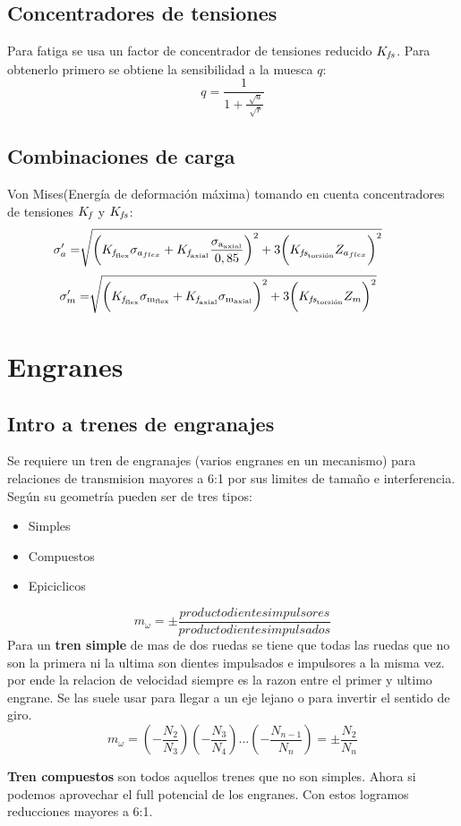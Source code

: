 \documentclass[twocolumn,10pt]{article}
\newcommand{\ansp}{\!\!\!\!\!\!\!}%
\newcommand{\bigpar}[1]{\bigg(
#1 \bigg) }
\newcommand{\Kf}[1]{ K_{\textit{\textrm{f}}_{\textrm{#1}}} }
\newcommand{\Kfs}[1]{ K_{\textit{\textrm{fs}}_{\textrm{#1}}} }
\newcommand{\siga}[1]{ \sigma_{{\textrm{a}}_{\textrm{#1}}} }
\newcommand{\sigm}[1]{ \sigma_{{\textrm{m}}_{\textrm{#1}}} }
\begin{document}
\subsection{Concentradores de tensiones}
Para fatiga se usa un factor de concentrador de tensiones reducido $\Kfs{}$. Para obtenerlo primero se obtiene la sensibilidad a la muesca $q$:
$$q=\frac{1}{1+\frac{\sqrt[]{a}}{\sqrt[]{r}}}$$

\subsection{Combinaciones de carga}
Von Mises(Energía de deformación máxima) tomando en cuenta concentradores de tensiones $\Kf{}$ y $\Kfs{}$:
$$ \ansp \ansp \sigma_a^\prime =\sqrt[ ]{ \bigpar {\Kf{flex} \sigma_{a_{flex}} +\Kf{axial} \frac{\siga{axial}}{0,85}}^2+3\bigpar{ \Kfs{torsión}Z_{a_{flex}} }^2 }  $$
$$\ansp\ansp\sigma_m^\prime =\sqrt[]{ \bigpar{  \Kf{flex}\sigm{flex} +\Kf{axial}\sigm{axial} }^2+3\bigpar{\Kfs{torsión}Z_m}^2 } $$
\section{Engranes}
\subsection*{Intro a trenes de engranajes}
Se requiere un tren de engranajes (varios engranes en un mecanismo) para relaciones de transmision mayores a 6:1 por sus limites de tamaño e interferencia.
Según su geometría pueden ser de tres tipos:
\begin{itemize}
    \item Simples
    \item Compuestos
    \item Epiciclicos
\end{itemize}
\[ m_\omega = \pm \frac{productodientesimpulsores}{producto dientes impulsados}
\]
Para un {\bf tren simple} de mas de dos ruedas se tiene que todas las ruedas que no son la primera ni la ultima son dientes impulsados e impulsores a la misma vez. por ende la relacion de velocidad siempre es la razon entre el primer y ultimo engrane. Se las suele usar para llegar a un eje lejano o para invertir el sentido de giro.
\[ 
m_\omega = \left(-\frac{N_2}{N_3}\right)\left(-\frac{N_3}{N_4}\right) \ldots \left(-\frac{N_{n-1}}{N_n}\right) = \pm \frac{N_2}{N_n}
\]

{\bf Tren compuestos} son todos aquellos trenes que no son simples. Ahora si podemos aprovechar el full potencial de los engranes. Con estos logramos reducciones mayores a 6:1.
\end{document}
